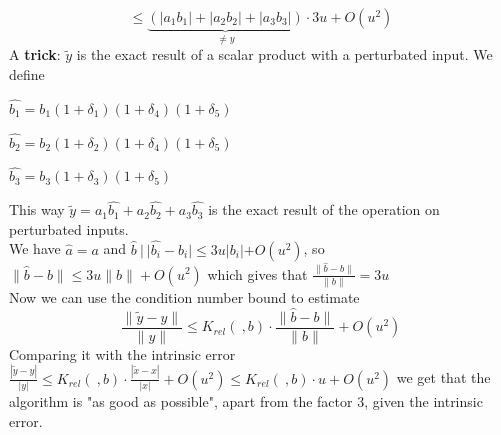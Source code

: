 \documentclass[10pt]{report}
\begin{document}
$$\leq \underset{\neq y}{\underbrace{\left(|a_1b_1|+|a_2b_2|+|a_3b_3|\right)}}\cdot 3u + O(u^2)$$
A \textbf{trick}: $\tilde{y}$ is the exact result of a scalar product with a perturbated input. We define \begin{list}{}{}
	\item $\hat{b_1} = b_1(1+\delta_1)(1+\delta_4)(1+\delta_5)$
	\item $\hat{b_2} = b_2(1+\delta_2)(1+\delta_4)(1+\delta_5)$
	\item $\hat{b_3} = b_3(1+\delta_3)(1+\delta_5)$
\end{list}
This way $\tilde{y} = a_1\hat{b_1}+a_2\hat{b_2}+a_3\hat{b_3}$ is the exact result of the operation on perturbated inputs.\\
We have $\hat{a} = a$ and $\hat{b}\:|\:|\hat{b_i}-b_i|\leq 3u|b_i|+O(u^2)$, so $\|\hat{b}-b\|\leq 3u\|b\|+O(u^2)$ which gives that $\frac{\|\hat{b}-b\|}{\|b\|} = 3u$\\
Now we can use the condition number bound to estimate
$$\frac{\|\tilde{y}-y\|}{\|y\|}\leq K_{rel}(\:,b)\cdot\frac{\|\hat{b}-b\|}{\|b\|} + O(u^2)$$
Comparing it with the intrinsic error $\frac{|\tilde{y}-y|}{|y|}\leq K_{rel}(\:,b)\cdot\frac{|\tilde{x}-x|}{|x|} + O(u^2)\leq K_{rel}(\:,b)\cdot u + O(u^2)$ we get that the  algorithm is "as good as possible", apart from the factor $3$, given the intrinsic error.
\end{document}
